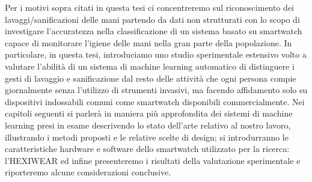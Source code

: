 Per i motivi sopra citati in questa tesi ci concentreremo sul riconoscimento dei lavaggi/sanificazioni delle mani partendo da dati non strutturati con lo scopo di investigare l'accuratezza nella 
classificazione di un sistema basato su smartwatch capace di monitorare l'igiene delle mani nella gran parte della popolazione. In particolare, in questa tesi, introduciamo uno studio sperimentale 
estensivo volto a valutare l'abilità di un sistema di machine learning automatico di distinguere i gesti di lavaggio e sanificazione dal resto delle attività che ogni persona compie giornalmente 
senza l'utilizzo di strumenti invasivi, ma facendo affidamento solo su dispositivi indossabili comuni come smartwatch disponibili commercialmente.
Nei capitoli seguenti si parlerà in maniera più approfondita dei sistemi di machine learning presi in esame descrivendo lo stato dell'arte relativo al nostro lavoro, illustrando i metodi proposti e le
relative scelte di design; si introdurranno le caratteristiche hardware e software dello smartwatch utilizzato per la ricerca: l'HEXIWEAR ed infine presenteremo i risultati della valutazione sperimentale
e riporteremo alcune considerazioni conclusive.
